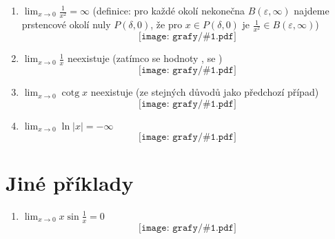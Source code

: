\documentclass[12pt,a4paper]{article}
\def\graf#1{\[\texttt{[image: grafy/\#1.pdf]}\]\par\vfil}
\begin{document}
\begin{enumerate}
	\item $\lim_{x \to 0} \tfrac{1}{x^2} = \infty$ (definice: pro každé okolí nekonečna $B(\varepsilon, \infty)$ najdeme prstencové okolí nuly $P(\delta, 0)$, že pro $x \in P(\delta, 0)$ je $\tfrac1{x^2} \in B(\varepsilon, \infty)$) \graf{invkvadr}
	\item $\lim_{x \to 0} \tfrac{1}{x}$ neexistuje (zatímco  se hodnoty ,  se ) \graf{invzero}
	\item $\lim_{x \to 0} \operatorname{cotg} x$ neexistuje (ze stejných důvodů jako předchozí případ) \graf{cotg}
	\item $\lim_{x \to 0} \operatorname{ln}\mathopen|x\mathclose| = -\infty$ \graf{logabs}
\end{enumerate}

\section*{Jiné příklady}

\begin{enumerate}
	\item $\lim_{x \to 0} x\sin\tfrac1x = 0$ \graf{sincrazy} 
\end{enumerate}
\end{document}
